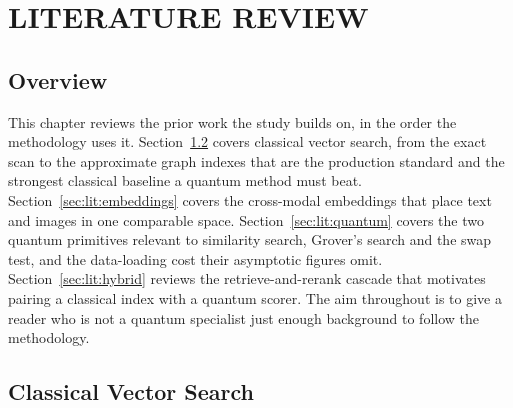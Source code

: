 \chapter{LITERATURE REVIEW}
\label{ch:literature}


\section{Overview}
\label{sec:lit:overview}

This chapter reviews the prior work the study builds on, in the order the
methodology uses it. Section~\ref{sec:lit:classical} covers classical vector
search, from the exact scan to the approximate graph indexes that are the
production standard and the strongest classical baseline a quantum method must
beat. Section~\ref{sec:lit:embeddings} covers the cross-modal embeddings that
place text and images in one comparable space. Section~\ref{sec:lit:quantum}
covers the two quantum primitives relevant to similarity search, Grover's search
and the swap test, and the data-loading cost their asymptotic figures omit.
Section~\ref{sec:lit:hybrid} reviews the retrieve-and-rerank cascade that
motivates pairing a classical index with a quantum scorer. The aim throughout is
to give a reader who is not a quantum specialist just enough background to follow
the methodology.

\section{Classical Vector Search}
\label{sec:lit:classical}



